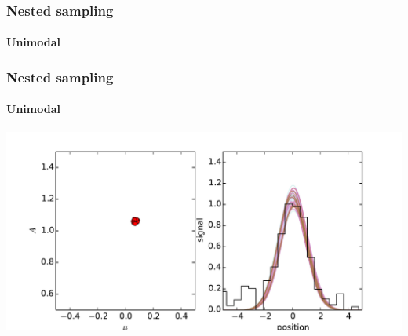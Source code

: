 \documentclass[]{beamer}
\begin{document}
\begin{frame}
  \frametitle{Nested sampling}
  \framesubtitle{Unimodal} 
\end{frame}
\begin{frame}
  \frametitle{Nested sampling}
  \framesubtitle{Unimodal} 
  \includegraphics[width=\textwidth]{movies/NS_1.pdf}
\end{frame}
\end{document}
